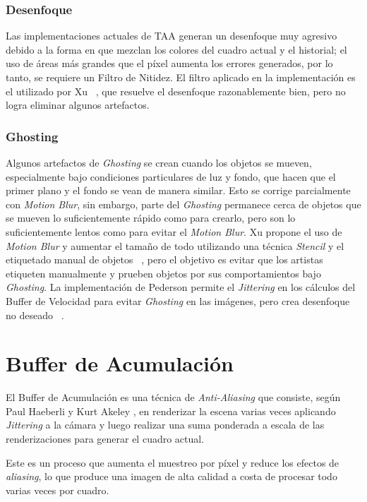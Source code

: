 \documentclass[pregrado]{tesis-usb} %
\begin{document}
\subsubsection{Desenfoque} 
Las implementaciones actuales de TAA generan un desenfoque muy agresivo debido a la forma en que mezclan los colores del cuadro actual y el historial; el uso de áreas más grandes que el píxel aumenta los errores generados, por lo tanto, se requiere un Filtro de Nitidez. El filtro aplicado en la implementación es el utilizado por Xu ~\cite{XU2016}, que resuelve el desenfoque razonablemente bien, pero no logra eliminar algunos artefactos. 

\subsubsection{Ghosting} 
Algunos artefactos de \textit{Ghosting} se crean cuando los objetos se mueven, especialmente bajo condiciones particulares de luz y fondo, que hacen que el primer plano y el fondo se vean de manera similar. Esto se corrige parcialmente con \textit{Motion Blur}, sin embargo, parte del \textit{Ghosting} permanece cerca de objetos que se mueven lo suficientemente rápido como para crearlo, pero son lo suficientemente lentos como para evitar el \textit{Motion Blur}. Xu propone el uso de \textit{Motion Blur} y aumentar el tamaño de todo utilizando una técnica \textit{Stencil} y el etiquetado manual de objetos ~\cite{XU2016}, pero el objetivo es evitar que los artistas etiqueten manualmente y prueben objetos por sus comportamientos bajo \textit{Ghosting}. La implementación de Pederson permite el \textit{Jittering} en los cálculos del Buffer de Velocidad para evitar \textit{Ghosting} en las imágenes, pero crea desenfoque no deseado ~\cite{Fuglsand2016}. 

\section{Buffer de Acumulación}
El Buffer de Acumulación es una técnica de \textit{Anti-Aliasing} que consiste, según Paul Haeberli y Kurt Akeley \cite{Haeberli1990}, en renderizar la escena varias veces aplicando \textit{Jittering} a la cámara y luego realizar una suma ponderada a escala de las renderizaciones para generar el cuadro actual.

Este es un proceso que aumenta el muestreo por píxel y reduce los efectos de \textit{aliasing}, lo que produce una imagen de alta calidad a costa de procesar todo varias veces por cuadro.
\end{document}
